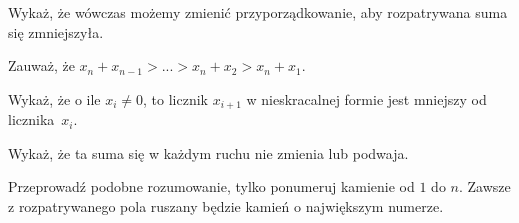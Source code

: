 
\begin{hints_list}
	\item Wykaż, że wówczas możemy zmienić przyporządkowanie, aby rozpatrywana suma się zmniejszyła.
	\item Zauważ, że $x_n + x_{n - 1} > ... > x_n + x_2 > x_n + x_1$.
	\item Wykaż, że o ile $x_{i} \neq 0$, to licznik $x_{i + 1}$ w nieskracalnej formie jest mniejszy od licznika~$x_i$.
	\item *
	\item Wykaż, że ta suma się w każdym ruchu nie zmienia lub podwaja.
	\item Przeprowadź podobne rozumowanie, tylko ponumeruj kamienie od $1$ do $n$. Zawsze z rozpatrywanego pola ruszany będzie kamień o największym numerze.
\end{hints_list}